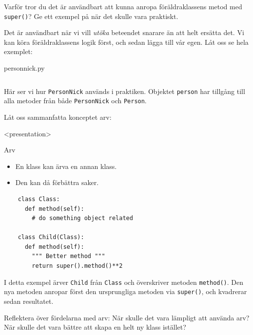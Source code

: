 \begin{exercise}
  Varför tror du det är användbart att kunna anropa föräldraklassens metod 
  med \texttt{super()}? Ge ett exempel på när det skulle vara 
  praktiskt.
\end{exercise}

Det är användbart när vi vill \emph{utöka} beteendet snarare än att helt 
ersätta det. Vi kan köra föräldraklassens logik först, och sedan lägga till 
vår egen. Låt oss se hela exemplet:

\begin{frame}[fragile]
  person\textunderscore nick.py \hrulefill
  \inputminted[linenos,firstline=32]{python}{examples/person_nick.py}
\end{frame}

Här ser vi hur \texttt{PersonNick} används i praktiken. 
Objektet \texttt{person} har tillgång till alla metoder från 
både \texttt{PersonNick} och \texttt{Person}.

Låt oss sammanfatta konceptet arv:

\begin{frame}[fragile]
  \begin{onlyenv}<presentation>
  \begin{block}{Arv}
    \begin{itemize}
      \item En klass kan ärva en annan klass.
      \item Den kan då förbättra saker.
    \end{itemize}
  \end{block}
  \end{onlyenv}

  \begin{verbatim}
    class Class:
      def method(self):
        # do something object related

    class Child(Class):
      def method(self):
        """ Better method """
        return super().method()**2
  \end{verbatim}
\end{frame}

I detta exempel ärver \texttt{Child} från 
\texttt{Class} och överskriver metoden 
\texttt{method()}. Den nya metoden anropar först den 
ursprungliga metoden via \texttt{super()}, och kvadrerar sedan 
resultatet.

\begin{exercise}
  Reflektera över fördelarna med arv: När skulle det vara lämpligt att
  använda arv? När skulle det vara bättre att skapa en helt ny klass istället?
\end{exercise}

